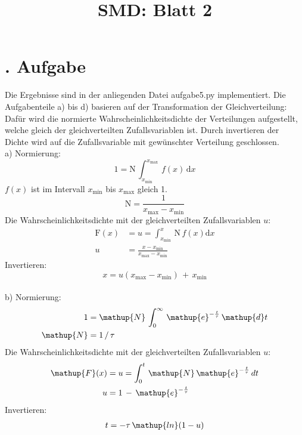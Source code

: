 \documentclass[
  bibliography=totoc,     %
  captions=tableheading,  %
  titlepage=firstiscover, %
]{scrartcl}
\title{SMD: Blatt 2}
\author{
  Sophie Bork
  \texorpdfstring{
    \\
    \href{mailto:sophie.bork@udo.edu}{sophie.bork@udo.edu}
  }{}
  \texorpdfstring{\and}{, }
  Simon Schulte
  \texorpdfstring{
    \\
    \href{mailto:simon.schulte@udo.edu}{simon.schulte@udo.edu}
  }{}
  \texorpdfstring{\and}{, }
  Michael Windau
  \texorpdfstring{
    \\
    \href{mailto:michael.windau@udo.edu}{michael.windau@udo.edu}
  }{}
}
\begin{document}
\maketitle
\thispagestyle{empty}
\newpage
\setcounter{page}{1}
\section{. Aufgabe}
\noindent
Die Ergebnisse sind in der anliegenden Datei aufgabe5.py implementiert.
Die Aufgabenteile a) bis d) basieren auf der Transformation der Gleichverteilung:
Dafür wird die normierte Wahrscheinlichkeitsdichte der Verteilungen aufgestellt,
welche gleich der gleichverteilten Zufallsvariablen ist. Durch invertieren der Dichte
wird auf die Zufallsvariable mit gewünschter Verteilung geschlossen.\\

\noindent
a) Normierung:
\begin{equation*}
  1 = \mathup{N}\,\int_{x_{\mathup{min}}}^{x_{\mathup{max}}}\,f(x)\,\mathup{d}x
\end{equation*}
$f(x)$ ist im Intervall $x_\mathup{min}$ bis $x_\mathup{max}$ gleich 1.
\begin{equation*}
  \mathup{N} = \frac{1}{x_\mathup{max}-x_\mathup{min}}
\end{equation*}
Die Wahrscheinlichkeitsdichte mit der gleichverteilten Zufallsvariablen $u$:
\begin{align*}
  \mathup{F}(x) &= u = \int_{x_{\mathup{min}}}^{x}\,\mathup{N}\,f(x)\mathup{d}x \\
  u &= \frac{x-x_{\mathup{min}}}{x_\mathup{max}-x_\mathup{min}}
\end{align*}
Invertieren:
\begin{equation*}
  x = u(x_\mathup{max}-x_\mathup{min})\,+\,x_\mathup{min}
\end{equation*}\\

\noindent
b) Normierung:
\begin{align*}
  1 &= \mathup{N}\,\int_{0}^{\infty}\,\mathup{e}^{-\frac{t}{\mathnormal{\tau}}}\,\mathup{d}t\\
  \mathup{N} &= 1\,/\,\mathnormal{\tau}
\end{align*}
Die Wahrscheinlichkeitsdichte mit der gleichverteilten Zufallsvariablen $u$:
\begin{align*}
  \mathup{F}(x) &= u = \int_{0}^{t}\,\mathup{N}\,\mathup{e}^{-\frac{t}{\mathnormal{\tau}}}\,{d}t \\
  u &= 1\,-\,\mathup{e}^{-\frac{t}{\mathnormal{\tau}}}
\end{align*}
Invertieren:
\begin{align*}
  t = -\mathnormal{\tau}\,\mathup{ln}(1-u)\\
\end{align*}
\end{document}
